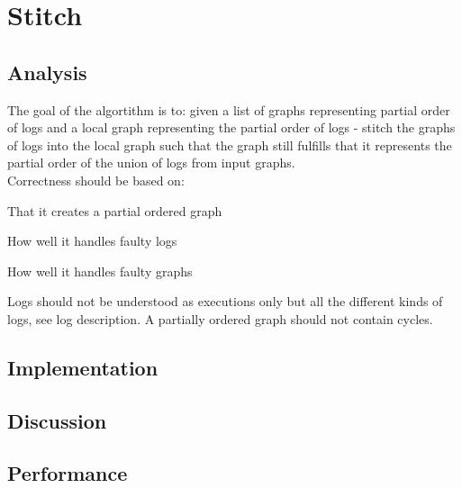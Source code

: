 \section{Stitch}
\subsection{Analysis} %
The goal of the algortithm is to: given a list of graphs representing partial order of logs and a local graph representing the partial order of logs - stitch the graphs of logs into the local graph such that the graph still fulfills that it represents the partial order of the union of logs from input graphs.\\

Correctness should be based on:
\begin{enumarate}
    \item That it creates a partial ordered graph
    \item How well it handles faulty logs
    \item How well it handles faulty graphs
\end{enumarate}

Logs should not be understood as executions only but all the different kinds of logs, see log description.
A partially ordered graph should not contain cycles.

\subsection{Implementation} %
\subsection{Discussion} %
\subsection{Performance} %


